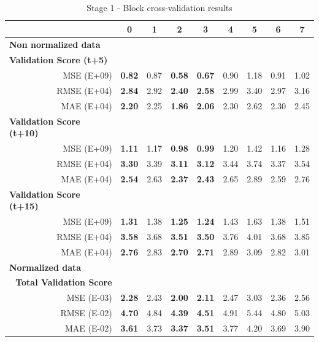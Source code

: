 \begin{table}[htbp]
  \centering
  \caption{Stage 1 - Block cross-validation results}
       \begin{tabular}{r|cccccccc}
    \toprule
    \multicolumn{1}{c}{} & 0     & 1     & 2     & 3     & 4     & 5     & 6     & 7 \\
    \midrule
    \multicolumn{1}{l|}{\textbf{Non normalized data}} &       &       &       &       &       &       &       &  \\
    \multicolumn{1}{l|}{\textbf{            Validation Score (t+5)      }} &       &       &       &       &       &       &       &  \\
    MSE (E+09)   & \textbf{0.82} & 0.87  & \textbf{0.58} & \textbf{0.67} & 0.90  & 1.18  & 0.91  & 1.02 \\
    RMSE (E+04)   & \textbf{2.84} & 2.92  & \textbf{2.40} & \textbf{2.58} & 2.99  & 3.40  & 2.97  & 3.16 \\
    MAE (E+04)   & \textbf{2.20} & 2.25  & \textbf{1.86} & \textbf{2.06} & 2.30  & 2.62  & 2.30  & 2.45 \\
    \multicolumn{1}{l|}{\textbf{            Validation Score (t+10)               }} &       &       &       &       &       &       &       &  \\
    MSE (E+09)   & \textbf{1.11} & 1.17  & \textbf{0.98} & \textbf{0.99} & 1.20  & 1.42  & 1.16  & 1.28 \\
    RMSE (E+04)   & \textbf{3.30} & 3.39  & \textbf{3.11} & \textbf{3.12} & 3.44  & 3.74  & 3.37  & 3.54 \\
    MAE (E+04)   & \textbf{2.54} & 2.63  & \textbf{2.37} & \textbf{2.43} & 2.65  & 2.89  & 2.59  & 2.76 \\
    \multicolumn{1}{l|}{\textbf{            Validation Score (t+15)               }} &       &       &       &       &       &       &       &  \\
    MSE (E+09)   & \textbf{1.31} & 1.38  & \textbf{1.25} & \textbf{1.24} & 1.43  & 1.63  & 1.38  & 1.51 \\
    RMSE (E+04)   & \textbf{3.58} & 3.68  & \textbf{3.51} & \textbf{3.50} & 3.76  & 4.01  & 3.68  & 3.85 \\
    MAE (E+04)   & \textbf{2.76} & 2.83  & \textbf{2.70} & \textbf{2.71} & 2.89  & 3.09  & 2.82  & 3.01 \\
    \midrule
    \multicolumn{1}{l|}{\textbf{Normalized data}} &       &       &       &       &       &       &       &  \\
    \textbf{Total Validation Score         } &       &       &       &       &       &       &       &  \\
    MSE (E-03)   & \textbf{2.28} & 2.43  & \textbf{2.00} & \textbf{2.11} & 2.47  & 3.03  & 2.36  & 2.56 \\
    RMSE (E-02)   & \textbf{4.70} & 4.84  & \textbf{4.39} & \textbf{4.51} & 4.91  & 5.44  & 4.80  & 5.03 \\
    MAE (E-02)   & \textbf{3.61} & 3.73  & \textbf{3.37} & \textbf{3.51} & 3.77  & 4.20  & 3.69  & 3.90 \\
    \end{tabular}%
  \label{valres}%
\end{table}%



